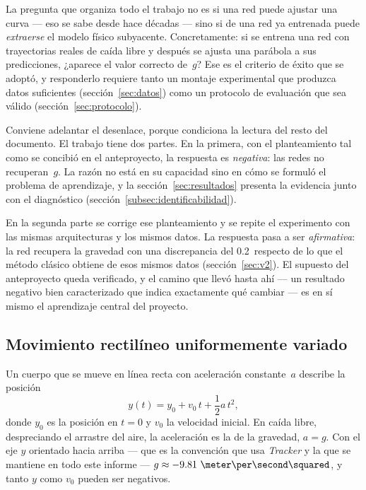 \documentclass[titlepage,11pt]{article}
\providecommand{\num}[1]{\ensuremath{#1}}
\providecommand{\SI}[2]{#1\,#2}
\providecommand{\percent}{\char37\relax}
\begin{document}
La pregunta que organiza todo el trabajo no es si una red puede ajustar una
curva --- eso se sabe desde hace décadas --- sino si de una red ya entrenada
puede \emph{extraerse} el modelo físico subyacente. Concretamente: si se
entrena una red con trayectorias reales de caída libre y después se ajusta una
parábola a sus predicciones, ¿aparece el valor correcto de~$g$? Ese es el
criterio de éxito que se adoptó, y responderlo requiere tanto un montaje
experimental que produzca datos suficientes (sección~\ref{sec:datos}) como un
protocolo de evaluación que sea válido (sección~\ref{sec:protocolo}).

Conviene adelantar el desenlace, porque condiciona la lectura del resto del
documento. El trabajo tiene dos partes. En la primera, con el planteamiento tal
como se concibió en el anteproyecto, la respuesta es \emph{negativa}: las redes
no recuperan~$g$. La razón no está en su capacidad sino en cómo se formuló el
problema de aprendizaje, y la sección~\ref{sec:resultados} presenta la evidencia
junto con el diagnóstico (sección~\ref{subsec:identificabilidad}).

En la segunda parte se corrige ese planteamiento y se repite el experimento con
las mismas arquitecturas y los mismos datos. La respuesta pasa a ser
\emph{afirmativa}: la red recupera la gravedad con una discrepancia del
\SI{0.2}{\percent} respecto de lo que el método clásico obtiene de esos mismos
datos (sección~\ref{sec:v2}). El supuesto del anteproyecto queda verificado, y
el camino que llevó hasta ahí --- un resultado negativo bien caracterizado que
indica exactamente qué cambiar --- es en sí mismo el aprendizaje central del
proyecto.

\subsection{Movimiento rectilíneo uniformemente variado}
\label{subsec:mru}

Un cuerpo que se mueve en línea recta con aceleración constante~$a$ describe
la posición
\begin{equation}
  y(t) = y_0 + v_0\,t + \frac{1}{2}a\,t^2,
  \label{eq:mruv}
\end{equation}
donde $y_0$ es la posición en $t=0$ y $v_0$ la velocidad inicial. En caída
libre, despreciando el arrastre del aire, la aceleración es la de la gravedad,
$a=g$. Con el eje $y$ orientado hacia arriba --- que es la convención que usa
\emph{Tracker} y la que se mantiene en todo este informe ---
$g\approx\num{-9.81}~\meter\per\second\squared$, y tanto $y$ como $v_0$ pueden
ser negativos.
\end{document}
